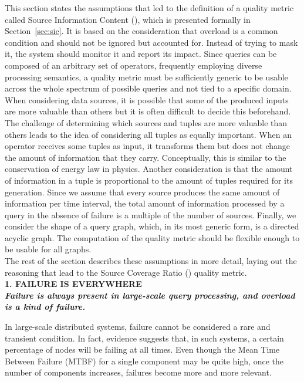 This section states the assumptions that led to the definition of a quality metric called Source
Information Content (\sic), which is presented formally in Section~\ref{sec:sic}.
It is based on the consideration that overload is a common condition and should not be ignored but
accounted for. Instead of trying to mask it, the system should monitor it and report its impact.
Since queries can be composed of an arbitrary set of operators, frequently employing diverse processing
semantics, a quality metric must be sufficiently generic to be usable across the whole spectrum of
possible queries and not tied to a specific domain. \\
When considering data sources, it is possible that some of the produced inputs are more valuable than
others but it is often difficult to decide this beforehand. The challenge of determining which sources
and tuples are more valuable than others leads to the idea of considering all tuples as equally
important. When an operator receives some tuples as input, it transforms them but does not change the
amount of information that they carry.
Conceptually, this is similar to the conservation of energy law in physics.
Another consideration is that the amount of information in a tuple is proportional to the amount of
tuples required for its generation. Since we assume that every source produces the same amount of
information per time interval, the total amount of information processed by a query in the absence of
failure is a multiple of the number of sources. Finally, we consider the shape of a query graph, which,
in its most generic form, is a directed acyclic graph. The computation of the quality metric should be
flexible enough to be usable for all graphs. \\
The rest of the section describes these assumptions in more detail, laying out the reasoning that lead to
the Source Coverage Ratio (\sic) quality metric.\\

\textbf{1. FAILURE IS EVERYWHERE\\ \textit{Failure is always present in large-scale query processing,
and overload is a kind of failure.}}
  
  In large-scale distributed systems, failure cannot be considered a rare and transient condition.
  In fact, evidence suggests that, in such systems, a certain percentage of nodes will be failing at
  all times. Even though the Mean Time Between Failure (MTBF) for a single component may be quite high,
  once the number of components increases, failures become more and more relevant. 
  
